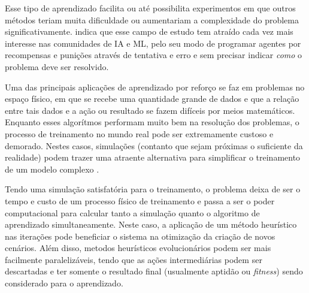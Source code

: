 
Esse tipo de aprendizado facilita ou at{\'e} possibilita experimentos
em que outros m{\'e}todos teriam muita dificuldade ou aumentariam a
complexidade do problema significativamente.
 indica que esse campo de estudo
tem atra{\'i}do cada vez mais interesse nas comunidades de IA e ML,
pelo seu modo de programar agentes por recompensas e puni{\c c}{\~o}es
atrav{\'e}s de tentativa e erro e sem precisar indicar \textit{como} o
problema deve ser resolvido.

Uma das principais aplica{\c c}{\~o}es de aprendizado por refor{\c c}o
se faz em problemas no espa{\c c}o f{\'i}sico, em que se recebe uma
quantidade grande de dados e que a rela{\c c}{\~a}o entre tais dados e
a a{\c c}{\~a}o ou resultado se fazem dif{\'i}ceis por meios
matem{\'a}ticos. Enquanto esses algor{\'i}tmos performam muito bem na
resolu{\c c}{\~a}o dos problemas, o processo de treinamento no mundo
real pode ser extremamente custoso e demorado. Nestes casos, simula{\c
  c}{\~o}es (contanto que sejam pr{\'o}ximas o suficiente da
realidade) podem trazer uma atraente alternativa para simplificar o
treinamento de um modelo complexo \cite{Rao_2020_CVPR}.

Tendo uma simula{\c c}{\~a}o satisfat{\'o}ria para o treinamento, o
problema deixa de ser o tempo e custo de um processo f{\'i}sico de
treinamento e passa a ser o poder computacional para calcular tanto a
simula{\c c}{\~a}o quanto o algoritmo de aprendizado simultaneamente.
Neste caso, a aplica{\c c}{\~a}o de um m{\'e}todo heur{\'i}stico nas
itera{\c c}{\~o}es pode beneficiar o sistema na otimiza{\c c}{\~a}o da
cria{\c c}{\~a}o de novos cen{\'a}rios. Al{\'e}m disso, metodos
heur{\'i}sticos evolucion{\'a}rios podem ser mais facilmente
paraleliz{\'a}veis, tendo que as a{\c c}{\~o}es intermedi{\'a}rias
podem ser descartadas e ter somente o resultado final (usualmente
aptid{\~a}o ou \textit{fitness}) sendo considerado para o aprendizado.

